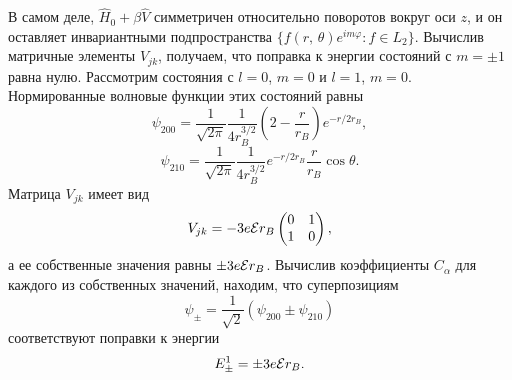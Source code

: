 \documentclass[a4paper
]{article}
\begin{document}
В самом деле, $\hat H_0+\beta \hat V$ симметричен относительно поворотов
вокруг оси $z$, и он оставляет инвариантными подпространства $\{f(r, \,
\theta)e^{im\varphi}:f\in L_2\}$. Вычислив матричные элементы $V_{jk}$,
получаем, что поправка к энергии состояний с $m=\pm 1$ равна нулю. Рассмотрим
состояния с $l=0$, $m=0$ и $l=1$, $m=0$. Нормированные волновые функции
этих состояний равны $$\psi_{200}=\frac{1}{\sqrt{2\pi}}\frac{1}{4r_B^{3/2}}
\left(2-\frac{r}{r_B}\right)e^{-r/2r_B},$$ $$\psi_{210}=\frac{1}{\sqrt{2\pi}}
\frac{1}{4r_B^{3/2}}e^{-r/2r_B}\frac{r}{r_B}\cos \theta.$$ Матрица $V_{jk}$
имеет вид $$V_{jk}=-3e{\cal E}r_B\begin{pmatrix}0 & 1 \\ 1 & 0\end{pmatrix},$$
а ее собственные значения равны $\pm 3e{\cal E}r_B$. Вычислив коэффициенты
$C_{\alpha}$ для каждого из собственных значений, находим, что
суперпозициям $$\psi_{\pm}=\frac{1}{\sqrt{2}}(\psi_{200}\pm \psi_{210})$$
соответствуют поправки к энергии $$E_{\pm}^1=\pm 3e{\cal E}r_B.$$
\end{document}

